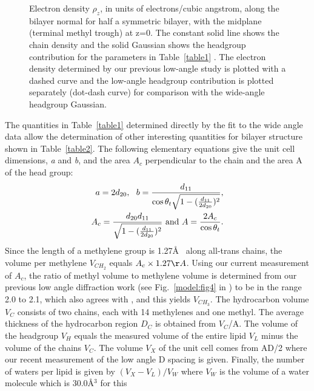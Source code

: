 \begin{figure}[ht]
\centerline {}
\caption{Electron density ${\rho}_{z}$, in units of electrons/cubic angstrom,
along the bilayer normal for half a symmetric bilayer, with the midplane
(terminal methyl trough) at z=0.  The constant solid line shows the
chain density and the solid Gaussian shows the headgroup
contribution for the parameters in Table\ \protect\ref{table1} .
The electron density determined by our previous low-angle
study \protect\cite{WSN89} is plotted with a dashed curve and
the low-angle headgroup contribution is plotted
separately (dot-dash curve) for comparison with the wide-angle
headgroup Gaussian. 
\label{model:fig6}}
\end{figure}

The quantities in Table\ \ref{table1} determined directly by the fit to the wide
angle data allow the determination of other interesting quantities
for bilayer structure shown in Table\ \ref{table2}.  The following elementary
equations give the unit cell dimensions, {\it a} and {\it b}, and
the area $A_{c}$ perpendicular to the chain and the area A
of the head group:
\begin{eqnarray}
\label{d-1}
a = 2 d_{20} , \ \ b = {d_{11} \over \cos {\theta}_{t} \sqrt{1-({d_{11} \over 2 
d_{20}})^2}}, \nonumber\\
A_{c} = {d_{20} d_{11} \over \sqrt{1-({d_{11} \over 2 d_{20}})^2}} \ \mbox{and} 
\   A = {2 A_{c} \over \cos {\theta}_{t}} .
\end{eqnarray}
Since the length of a methylene group is
1.27\AA~ along all-trans chains, the volume per methylene $V_{CH_{2}}$ equals
$A_{c} \times 1.27\AA$. Using our current measurement of $A_{c}$, the ratio of methyl 
volume to methylene volume is
determined from our previous low angle diffraction work (see Fig.\ \ref{model:fig4}
in \cite{WSN89}) to be in the range 2.0 to 2.1, which also agrees with
\cite{NW88,WW5}, and this yields $V_{CH_{3}}$. The 
hydrocarbon volume $V_{C}$ consists of two chains, each with 14 methylenes
and one methyl.  The average thickness of the hydrocarbon region $D_{C}$ is 
obtained from $V_{C}$/A. The volume of the
headgroup $V_{H}$ equals the measured volume \cite{NW78} of the entire lipid
$V_{L}$ minus the volume of the chains $V_{C}$. The volume $V_{X}$ of the unit 
cell comes from AD/2 where our recent measurement of the low angle
D spacing \cite{STN92} is given.  
Finally, the number of waters per lipid is given by $(V_{X}-V_{L})/V_{W}$ where 
$V_{W}$ is the volume of a water molecule which is 30.0\AA$^{3}$ for this 
